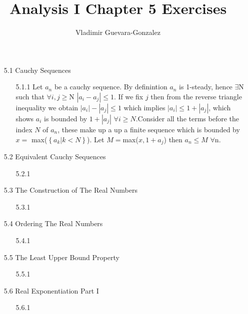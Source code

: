 \documentclass{article}
\begin{document}
\title{Analysis I Chapter 5 Exercises}
\author{Vladimir Guevara-Gonzalez}
\maketitle
\thispagestyle{fancy}
\begin{enumerate}
\item[5.1] Cauchy Sequences
  \begin{enumerate}
  \item[5.1.1] Let \(a_{n}\) be a cauchy sequence. By definintion
    \(a_{n}\) is 1-steady, hence \(\exists\)N such that
    \(\forall i,j \geq\)N \(\left|a_{i} - a_{j}\right| \leq 1\). If
    we fix \(j\) then from the reverse triangle inequality we
    obtain \(\left| a_{i}\right| - \left|a_{j}\right| \leq 1\) which
    implies \(\left|a_{i}\right| \leq 1 + \left|a_{j}\right|\),
    which shows \(a_{i}\) is bounded by
    \(1+\left|a_{j} \right|\)  \(\forall i \geq N\).Consider all the
    terms before the index \(N\) of \(a_{n}\), these make up a
    up a finite sequence which is bounded by \(x =\) max(\(\left \{a_{k} | k < N\right \}\)). Let \(M = \)max(\(x, 1+a_{j}\)) then
    \(a_{n} \leq M \) \(\forall \)n.
  \end{enumerate}
\item[5.2] Equivalent Cauchy Sequences
  \begin{enumerate}
    \item[5.2.1]
  \end{enumerate}
\item[5.3] The Construction of The Real Numbers
  \begin{enumerate}
  \item[5.3.1]
  \end{enumerate}
\item[5.4] Ordering The Real Numbers
  \begin{enumerate}
  \item[5.4.1]
  \end{enumerate}
  \item[5.5] The Least Upper Bound Property
  \begin{enumerate}
    \item[5.5.1]
  \end{enumerate}
  \item[5.6] Real Exponentiation Part I
  \begin{enumerate}
    \item[5.6.1]
  \end{enumerate}
\end{enumerate}
\end{document}

